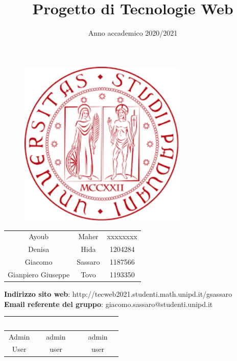 \documentclass[12pt,a4paper]{article}
\title{Progetto di Tecnologie Web}
\author{}
\date{Anno accademico 2020/2021}
\begin{document}
\maketitle
\begin{figure}[H]
	\centering
	\includegraphics[width=8cm]{utility/logo.png}
\end{figure}
\begin{table}[H]
	\centering
	\renewcommand{\arraystretch}{2}
	\begin{longtable}{c c c}
		\rowcolor{green}\multicolumn{3}{c }{\textcolor{white}{\textbf{Componenti}}}\\
		\endhead
		 Ayoub & Maher & xxxxxxxx \\
		 Denisa & Hida & 1204284 \\
		 Giacomo & Sassaro & 1187566 \\
		 Gianpiero Giuseppe & Tovo & 1193350 \\
	\end{longtable}
\end{table}

\begin{center}
	\textbf{Indirizzo sito web}: http://tecweb2021.studenti.math.unipd.it/gsassaro\\
	\textbf{Email referente del gruppo}: giacomo.sassaro@studenti.unipd.it
\end{center}

\begin{table}[H]
	\centering
	\renewcommand{\arraystretch}{2}
	\begin{longtable}{c | c c}
		\rowcolor{green}\textcolor{white}{\textbf{Utenti}} & \textcolor{white}{\textbf{Username}} & \textcolor{white}{\textbf{Password}}\\
		\endhead
		Admin & admin & admin\\
		User & user  & user \\
	\end{longtable}
\end{table}
\newpage
{}
\tableofcontents
\newpage

\newpage

\newpage

\newpage

\newpage

\end{document}

